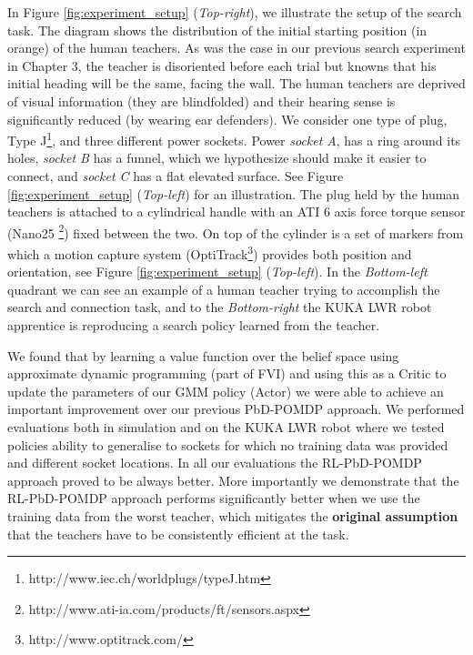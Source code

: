 In Figure \ref{fig:experiment_setup} (\textit{Top-right}), we illustrate the setup of the search task. The diagram shows
the distribution of the initial starting position (in orange) of the human teachers. As was the case in our previous search experiment
in Chapter 3, the teacher is disoriented before each trial but knowns that his initial heading will be the same, facing the wall. 
The human teachers are deprived of visual information (they are blindfolded) and their hearing sense is significantly 
reduced (by wearing ear defenders).  We consider one type of plug, Type J\footnote{http://www.iec.ch/worldplugs/typeJ.htm}, 
and three different power sockets. Power \textit{socket A}, has a ring around its holes, \textit{socket B} has a funnel, which we 
hypothesize should make it easier to connect, and \textit{socket C} has a flat elevated surface. See Figure \ref{fig:experiment_setup}
(\textit{Top-left}) for an illustration. The plug held by the human teachers is attached to a cylindrical handle with 
an ATI 6 axis force torque sensor (Nano25 \footnote{http://www.ati-ia.com/products/ft/sensors.aspx}) fixed 
between the two. On top of the cylinder is a set of markers from which a motion capture system 
(OptiTrack\footnote{http://www.optitrack.com/}) provides both position and orientation, see Figure \ref{fig:experiment_setup} (\textit{Top-left}). In the \textit{Bottom-left} quadrant we
can see an example of a human teacher trying to accomplish the search and connection task, and to the \textit{Bottom-right} the KUKA
LWR robot apprentice is reproducing a search policy learned from the teacher.


We found that by learning a value function over the belief space using approximate dynamic programming (part of FVI) and using 
this as a Critic to update the parameters of our GMM policy (Actor) we were able to achieve an important improvement over our 
previous PbD-POMDP approach. We  performed evaluations both in simulation and on the KUKA LWR robot where we tested 
policies ability to generalise to sockets for which no training data was provided and different socket locations. 
In all our evaluations the RL-PbD-POMDP approach proved to be always better. More importantly we demonstrate that 
the RL-PbD-POMDP approach performs significantly better when we use the training data from the worst teacher, 
which mitigates the \textbf{original assumption} that the teachers have to be consistently efficient at the task.


